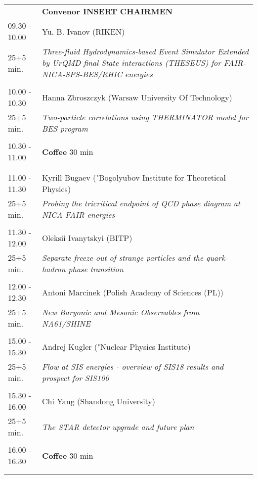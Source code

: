 \begin{longtable}{p{3cm}p{13cm}}
&\hfill {\bf Convenor INSERT CHAIRMEN }\\ 
09.30 - 10.00 & Yu. B. Ivanov (RIKEN)\\ 
25+5 min. & {\it Three-fluid Hydrodynamics-based Event Simulator Extended by UrQMD final State interactions  (THESEUS) for FAIR-NICA-SPS-BES/RHIC energies}\\ 
 & \\ 
10.00 - 10.30 & Hanna Zbroszczyk (Warsaw University Of Technology)\\ 
25+5 min. & {\it Two-particle correlations using THERMINATOR model for BES program}\\ 
 & \\ 
10.30 - 11.00 & {\bf Coffee} \hfill 30 min \\ 
 & \\ 
 & \\ 
11.00 - 11.30 & Kyrill Bugaev ("Bogolyubov Institute for Theoretical Physics)\\ 
25+5 min. & {\it Probing the tricritical endpoint of QCD phase diagram at NICA-FAIR energies}\\ 
 & \\ 
11.30 - 12.00 & Oleksii Ivanytskyi (BITP)\\ 
25+5 min. & {\it Separate freeze-out of strange particles and the quark-hadron phase transition}\\ 
 & \\ 
12.00 - 12.30 & Antoni Marcinek (Polish Academy of Sciences (PL))\\ 
25+5 min. & {\it New Baryonic and Mesonic Observables from NA61/SHINE}\\ 
 & \\ 
15.00 - 15.30 & Andrej Kugler ("Nuclear Physics Institute)\\ 
25+5 min. & {\it Flow at SIS energies - overview of SIS18 results and prospect for SIS100}\\ 
 & \\ 
15.30 - 16.00 & Chi Yang (Shandong University)\\ 
25+5 min. & {\it The STAR detector upgrade and future plan}\\ 
 & \\ 
16.00 - 16.30 & {\bf Coffee} \hfill 30 min \\ 
 & \\ 
 & \\ 
\end{longtable}

